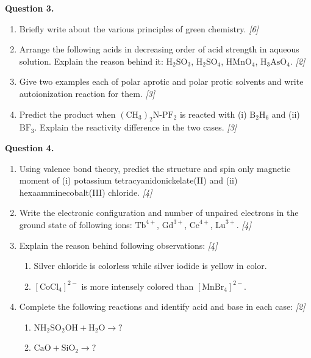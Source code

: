 \documentclass[11pt,a4paper]{article}
\newcommand{\pts}[1]{\hfill \textit{[#1]}}
\begin{document}
\bigskip

\noindent \textbf{Question 3.}
\begin{enumerate}[label=(\alph*)]
  \item Briefly write about the various principles of green chemistry. \pts{6}
  \item Arrange the following acids in decreasing order of acid strength in aqueous solution. Explain the reason behind it: $\text{H}_2\text{SO}_3$, $\text{H}_2\text{SO}_4$, $\text{HMnO}_4$, $\text{H}_3\text{AsO}_4$. \pts{2}
  \item Give two examples each of polar aprotic and polar protic solvents and write autoionization reaction for them. \pts{3}
  \item Predict the product when $(\text{CH}_3)_2\text{N-PF}_2$ is reacted with (i) $\text{B}_2\text{H}_6$ and (ii) $\text{BF}_3$. Explain the reactivity difference in the two cases. \pts{3}
\end{enumerate}

\bigskip

\noindent \textbf{Question 4.}
\begin{enumerate}[label=(\alph*)]
  \item Using valence bond theory, predict the structure and spin only magnetic moment of (i) potassium tetracyanidonickelate(II) and (ii) hexaamminecobalt(III) chloride. \pts{4}
  \item Write the electronic configuration and number of unpaired electrons in the ground state of following ions: $\text{Tb}^{4+}$, $\text{Gd}^{3+}$, $\text{Ce}^{4+}$, $\text{Lu}^{3+}$. \pts{4}
  \item Explain the reason behind following observations: \pts{4}
  \begin{enumerate}[label=(\roman*)]
    \item Silver chloride is colorless while silver iodide is yellow in color.
    \item $[\text{CoCl}_4]^{2-}$ is more intensely colored than $[\text{MnBr}_4]^{2-}$.
  \end{enumerate}
  \item Complete the following reactions and identify acid and base in each case: \pts{2}
  \begin{enumerate}[label=(\roman*)]
    \item $\text{NH}_2\text{SO}_2\text{OH} + \text{H}_2\text{O} \rightarrow ?$
    \item $\text{CaO} + \text{SiO}_2 \rightarrow ?$
  \end{enumerate}
\end{enumerate}
\end{document}
